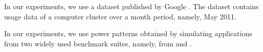 In our experiments, we use a dataset published by Google \cite{google}. The
dataset contains usage data of a computer cluster over a month period, namely,
May 2011.

In our experiments, we use power patterns obtained by simulating applications
from two widely used benchmark suites, namely, from 
\cite{bienia2011} and  \cite{cpu2006}.
